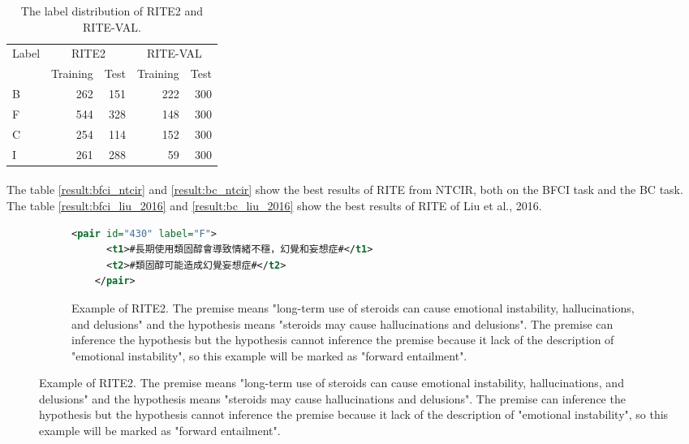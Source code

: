 \documentclass{article}
\begin{document}
\begin{CJK*}{UTF8}{bkai}
\begin{table}[ht!]
  \centering
  \begin{tabular}{|l|r|r|r|r|}
    \hline
    \multirow{2}{*}{Label} & \multicolumn{2}{c|}{RITE2} & \multicolumn{2}{c|}{RITE-VAL} \\
    \cline{2-5}
    & Training & Test & Training & Test \\ \hline
    B & 262 & 151 & 222 & 300 \\ \hline
    F & 544 & 328 & 148 & 300 \\ \hline
    C & 254 & 114 & 152 & 300 \\ \hline
    I & 261 & 288 & 59 & 300 \\ \hline
  \end{tabular}
  \caption{The label distribution of RITE2 and RITE-VAL.}
\end{table}

\paragraph{}
The table \ref{result:bfci_ntcir} and \ref{result:bc_ntcir} show the best results of RITE from NTCIR, both on the BFCI task and the BC task. The table \ref{result:bfci_liu_2016} and \ref{result:bc_liu_2016} show the best results of RITE of Liu et al., 2016.

\begin{figure}[ht!]
  \centering
  \caption{The examples of RITE2 and RITE-VAL}
  \begin{subfigure}{1\linewidth}
    \caption{Example of RITE2. The premise means "long-term use of steroids can cause emotional instability, hallucinations, and delusions" and the hypothesis means "steroids may cause hallucinations and delusions". The premise can inference the hypothesis but the hypothesis cannot inference the premise because it lack of the description of "emotional instability", so this example will be marked as "forward entailment".}
    \begin{minipage}{\linewidth}
    \begin{lstlisting}[language=XML]
    <pair id="430" label="F">
      <t1>#長期使用類固醇會導致情緒不穩，幻覺和妄想症#</t1>
      <t2>#類固醇可能造成幻覺妄想症#</t2>
    </pair>
    \end{lstlisting}
    \end{minipage}
  \end{subfigure}


\end{figure}
\end{CJK*}
\end{document}
